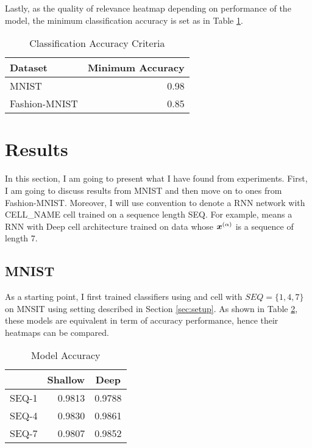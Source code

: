 Lastly, as the quality of relevance heatmap depending on performance of the model, the minimum classification accuracy is set as in Table  \ref{tab:min_acc}. 

\begin{table}[h]
\centering
\begin{tabular}{ll}
\multicolumn{1}{l|}{\textbf{Dataset}} & \textbf{Minimum Accuracy} \\ \hline
\multicolumn{1}{l|}{MNIST}            & \multicolumn{1}{r}{0.98}  \\
\multicolumn{1}{l|}{Fashion-MNIST}    & \multicolumn{1}{r}{0.85}  \\
\end{tabular}
\caption{Classification Accuracy Criteria}
\label{tab:min_acc}
\end{table}


\section{Results}
In this section, I am going to present what I have  found from experiments. First, I am going to discuss results from MNIST and then move on to ones from Fashion-MNIST. Moreover, I will use  convention to denote a RNN network with CELL\_NAME cell trained on a sequence length SEQ. For example,  means a RNN with Deep cell architecture trained on data whose $\patvector{x}^{(\alpha)}$ is a sequence of length 7.

\subsection{MNIST}
As a starting point, I first trained classifiers using  and  cell with $SEQ=\{1, 4, 7\}$ on MNSIT using setting described in Section \ref{sec:setup}. As shown in Table \ref{tab:mnist_model_acc}, these models are equivalent  in term of accuracy performance, hence their heatmaps can be compared. 

\begin{table}[]
\centering
\begin{tabular}{lrr}
\textbf{}                  & \multicolumn{1}{c}{\textbf{Shallow}} & \multicolumn{1}{c}{\textbf{Deep}} \\ \hline
\multicolumn{1}{l|}{SEQ-1} & 0.9813                               & 0.9788                            \\
\multicolumn{1}{l|}{SEQ-4} & 0.9830                               & 0.9861                            \\
\multicolumn{1}{l|}{SEQ-7} & 0.9807                               & 0.9852                           
\end{tabular}
\caption{Model Accuracy}
\label{tab:mnist_model_acc}
\end{table}

